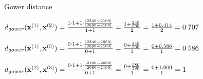 \documentclass[11pt,compress,t,notes=noshow, xcolor=table]{beamer}
\begin{document}
\begin{vbframe}{Gower distance}
\vfill

$d_{gower}(\mathbf{x}^{(1)},\mathbf{x}^{(2)}) = \frac{ 1 \cdot 1 + 1 \cdot \frac{\left| 2340 - 2100 \right|}
{\left| 2680 - 2100 \right|}}{1 + 1} = \frac{1 + \frac{240}{580}}{2} = \frac{1 + 0.414}{2} = 0.707
$

\vfill

$d_{gower}(\mathbf{x}^{(1)},\mathbf{x}^{(3)}) = \frac{ 0 \cdot 1 + 1 \cdot \frac{\left| 2340 - 2680 \right|}
{\left| 2680 - 2100 \right|}}{0 + 1} = \frac{0 + \frac{340}{580}}{1} = \frac{0 + 0.586}{1} = 0.586
$

\vfill

$d_{gower}(\mathbf{x}^{(2)},\mathbf{x}^{(3)}) = \frac{0 \cdot 1 + 1 \cdot \frac{\left| 2100 - 2680 \right|}
{\left| 2680 - 2100 \right|}}{0 + 1} = \frac{0 + \frac{580}{580}}{1} = \frac{0 + 1.000}{1} = 1
$

\vfill
\end{vbframe}





\endlecture
\end{document}
